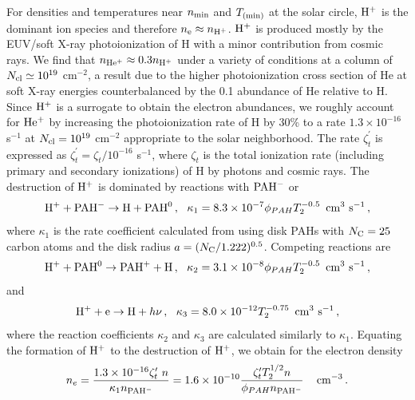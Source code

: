 \documentclass[12pt,preprint,flushrt]{aastex}
\newcommand{\beq}{\begin{equation}}
\newcommand{\eeq}{\end{equation}}
\newcommand{\tmin}{T_{\rm (min)}}
\newcommand{\zio}{\zeta_{t}^\prime}
\begin{document}
For densities and temperatures near $n_{\rm min}$ and $\tmin$
at the solar circle, ${\rm H^+}$ is the dominant ion species and
therefore $n_{\rm e}\approx n_{\rm H^+}$. ${\rm H^+}$ is produced
mostly by the EUV/soft X-ray photoionization of H with a minor contribution
from cosmic rays. We find that $n_{\rm He^+}\approx 0.3 n_{\rm H^+}$
under a variety of conditions at a column of $N_{\rm cl}\simeq 10^{19}$
cm$^{-2}$, a result due to the higher photoionization cross section
of He at soft X-ray energies counterbalanced by the 0.1 abundance
of He relative to H. Since ${\rm H^+}$ is a surrogate to obtain
the electron abundances, we roughly account for ${\rm He^+}$
by increasing the photoionization rate of H by 30\% to a rate
$1.3\times 10^{-16}$ s$^{-1}$ at $N_{\rm cl}=10^{19}$ cm$^{-2}$
appropriate to the solar neighborhood. The rate
$\zio$ is expressed as
$\zio = \zeta_t/ 10^{-16}$ s$^{-1}$, where $\zeta_t$
is the total ionization rate (including primary and secondary ionizations)
 of H  by photons and cosmic rays.
The destruction of ${\rm H^+}$ is dominated by reactions with
${\rm PAH^-}$ or
\beq
{\rm H^+  + PAH^-}  \rightarrow  {\rm H + PAH^0}\,, \,\,\,\,
\kappa_1  = 8.3\times 10^{-7} \phi _{PAH}T_2^{-0.5}\,\,\,{\rm cm^3\,\, s^{-1} }\, ,
\eeq
where $\kappa_1$ is the rate coefficient calculated from \cite{draine87}
using disk PAHs with $N_{\rm C}= 25$ carbon atoms and the disk radius
$a= (N_{\rm C}/1.222)^{0.5}$. Competing reactions are
\beq
{\rm H^+  + PAH^0}  \rightarrow  {\rm PAH^+ + H}\,, \,\,\,\,
\kappa_2  = 3.1\times 10^{-8} \phi _{PAH} T_2^{-0.5}\,\,\,{\rm cm^3\,\, s^{-1} }\, ,
\eeq
and
\beq
{\rm H^+  + e}  \rightarrow  {\rm H} + h\nu \,, \,\,\,\,
\kappa_3  = 8.0\times 10^{-12} T_2^{-0.75}\,\,\,{\rm cm^3\,\, s^{-1} }\, ,
\eeq
where the reaction coefficients $\kappa_2$ and $\kappa_3$  are
calculated similarly to $\kappa_1$. Equating the formation of ${\rm H^+}$
to the destruction of ${\rm H^+}$, we obtain for the electron density
\beq
n_e  =  \frac{1.3\times 10^{-16} \zio \ n}
            {\kappa_1 n_{\rm PAH^-}}
     =  1.6\times 10^{-10} \frac{\zio T_2^{1/2} n}{\phi _{PAH}n_{\rm PAH^-}}
                                    \,\,\,\,\,\,\,{\rm cm^{-3}}\, .
\label{eq:ne1}
\eeq
\end{document}
